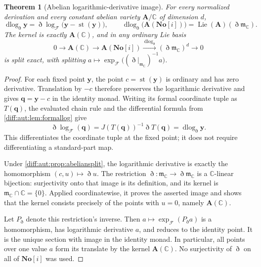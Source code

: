\documentclass[11pt,letterpaper]{article}
\numberwithin{equation}{section}
\newtheorem{theorem}{Theorem}[section]
\theoremstyle{definition}
\theoremstyle{remark}
\newcommand{\SC}{\mathbf{No}[i]}
\newcommand{\C}{\mathbb C}
\newcommand{\mm}{\mathfrak m}
\newcommand{\st}{\operatorname{st}}
\newcommand{\Dn}{\eth}
\newcommand{\Lie}{\operatorname{Lie}}
\newcommand{\dlog}{\operatorname{dlog}}
\begin{document}
\begin{theorem}[Abelian logarithmic-derivative image]
\label{diff:aut:thm:abelianimage}
For every normalized derivation and every constant abelian variety $\mathbf A/\C$
of dimension $d$,
\begin{equation}\label{diff:aut:eq:abelianimage}
 \dlog_{\Dn}\mathbf y=\Dn\log_{\mathcal F}\bigl(\mathbf y-\st(\mathbf y)\bigr),
 \qquad
 \dlog_{\Dn}\bigl(\mathbf A(\SC)\bigr)=\Lie(\mathbf A)(\Dn\mm_{\C}).
\end{equation}
The kernel is exactly $\mathbf A(\C)$, and in any ordinary Lie basis
\begin{equation}\label{diff:aut:eq:abelianexact}
 0\longrightarrow\mathbf A(\C)\longrightarrow\mathbf A(\SC)
 \xrightarrow{\ \dlog_{\Dn}\ }(\Dn\mm_{\C})^{d}\longrightarrow0
\end{equation}
is split exact, with splitting $a\mapsto\exp_{\mathcal F}\bigl((\Dn|_{\mm_{\C}})^{-1}a\bigr)$.
\end{theorem}
\begin{proof}
For each fixed point $\mathbf y$, the point
$c=\st(\mathbf y)$ is ordinary and has zero derivative.
Translation by $-c$ therefore preserves the logarithmic derivative
and gives $\mathbf q=\mathbf y-c$ in the identity monad.
Writing its formal coordinate tuple as $T(\mathbf q)$, the evaluated
chain rule and the differential formula from
\cref{diff:aut:lem:formallog} give
\[
 \Dn\log_{\mathcal F}(\mathbf q)
 =J(T(\mathbf q))^{-1}\Dn T(\mathbf q)
 =\dlog_{\Dn}\mathbf y.
\]
This differentiates the coordinate tuple at the fixed point; it does
not require differentiating a standard-part map.

Under \cref{diff:aut:prop:abeliansplit}, the logarithmic derivative
is exactly the homomorphism $(c,u)\mapsto\Dn u$.
The restriction $\Dn:\mm_\C\to\Dn\mm_\C$ is a
$\C$-linear bijection: surjectivity onto that image is its
definition, and its kernel is $\mm_\C\cap\C=\{0\}$.
Applied coordinatewise, it proves the asserted image and shows
that the kernel consists precisely of the points with $u=0$,
namely $\mathbf A(\C)$.

Let $P_{\Dn}$ denote this restriction's inverse. Then
$a\mapsto\exp_{\mathcal F}(P_{\Dn}a)$ is a homomorphism,
has logarithmic derivative $a$, and reduces to the identity point.
It is the unique section with image in the identity monad.
In particular, all points over one value $a$ form its translate
by the kernel $\mathbf A(\C)$. No surjectivity of $\Dn$ on
all of $\SC$ was used.
\end{proof}
\end{document}
